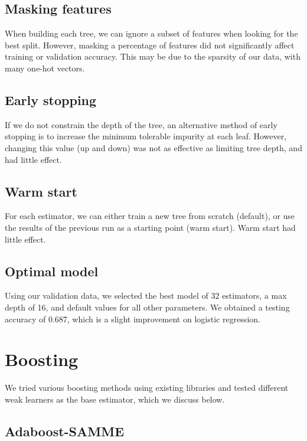 \documentclass{article}
\begin{document}
\begin{multicols}{2}
\subsection{Masking features}

When building each tree,
we can ignore a subset of features
when looking for the best split.
However, masking a percentage of features
did not significantly affect training or
validation accuracy.
This may be due to the sparsity
of our data, with many one-hot vectors.

\subsection{Early stopping}

If we do not constrain the depth of the tree,
an alternative method of early stopping
is to increase the minimum tolerable impurity at each leaf.
However, changing this value (up and down)
was not as effective as
limiting tree depth, and had little effect.

\subsection{Warm start}

For each estimator,
we can either train a new tree from scratch (default),
or use the results of the previous run
as a starting point (warm start).
Warm start had little effect.

\subsection{Optimal model}

Using our validation data,
we selected the best model
of 32 estimators, a max depth of 16,
and default values for all other parameters.
We obtained a testing accuracy of 0.687,
which is a slight improvement on logistic regression.

\section{Boosting}

We tried various boosting methods using existing libraries
and tested different weak learners as the base estimator,
which we discuss below.

\subsection{Adaboost-SAMME}


\end{multicols}
\end{document}
